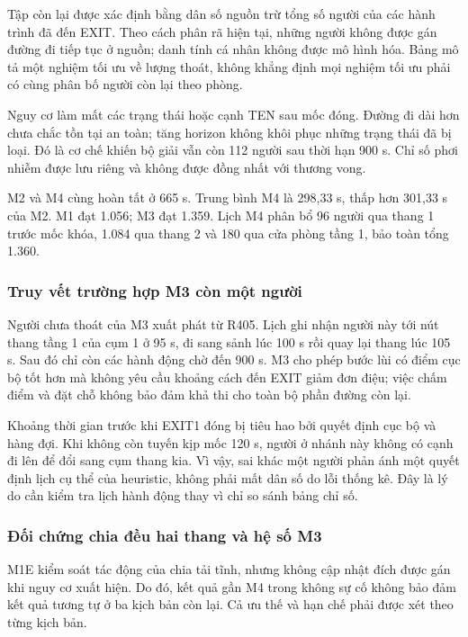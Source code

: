 Tập còn lại được xác định bằng dân số nguồn trừ tổng số người của các hành trình đã đến EXIT. Theo cách phân rã hiện tại, những người không được gán đường đi tiếp tục ở nguồn; danh tính cá nhân không được mô hình hóa. Bảng mô tả một nghiệm tối ưu về lượng thoát, không khẳng định mọi nghiệm tối ưu phải có cùng phân bố người còn lại theo phòng.

Nguy cơ làm mất các trạng thái hoặc cạnh TEN sau mốc đóng. Đường đi dài hơn chưa chắc tồn tại an toàn; tăng horizon không khôi phục những trạng thái đã bị loại. Đó là cơ chế khiến bộ giải vẫn còn 112 người sau thời hạn 900 s. Chỉ số phơi nhiễm được lưu riêng và không được đồng nhất với thương vong.

M2 và M4 cùng hoàn tất ở 665 s. Trung bình M4 là 298,33 s, thấp hơn 301,33 s của M2. M1 đạt 1.056; M3 đạt 1.359. Lịch M4 phân bổ 96 người qua thang 1 trước mốc khóa, 1.084 qua thang 2 và 180 qua cửa phòng tầng 1, bảo toàn tổng 1.360.

\subsubsection{Truy vết trường hợp M3 còn một người}
Người chưa thoát của M3 xuất phát từ R405. Lịch ghi nhận người này tới nút thang tầng 1 của cụm 1 ở 95 s, đi sang sảnh lúc 100 s rồi quay lại thang lúc 105 s. Sau đó chỉ còn các hành động chờ đến 900 s. M3 cho phép bước lùi có điểm cục bộ tốt hơn mà không yêu cầu khoảng cách đến EXIT giảm đơn điệu; việc chấm điểm và đặt chỗ không bảo đảm khả thi cho toàn bộ phần đường còn lại.

Khoảng thời gian trước khi EXIT1 đóng bị tiêu hao bởi quyết định cục bộ và hàng đợi. Khi không còn tuyến kịp mốc 120 s, người ở nhánh này không có cạnh đi lên để đổi sang cụm thang kia. Vì vậy, sai khác một người phản ánh một quyết định lịch cụ thể của heuristic, không phải mất dân số do lỗi thống kê. Đây là lý do cần kiểm tra lịch hành động thay vì chỉ so sánh bảng chỉ số.

\subsubsection{Đối chứng chia đều hai thang và hệ số M3}
M1E kiểm soát tác động của chia tải tĩnh, nhưng không cập nhật đích được gán khi nguy cơ xuất hiện. Do đó, kết quả gần M4 trong không sự cố không bảo đảm kết quả tương tự ở ba kịch bản còn lại. Cả ưu thế và hạn chế phải được xét theo từng kịch bản.

